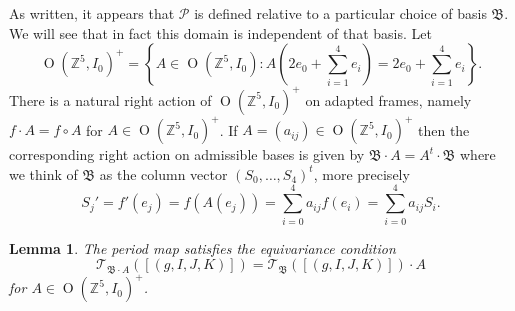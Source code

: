 \documentclass[12pt,letterpaper,reqno]{amsart}
\newtheorem{lem}[thm]{Lemma}
\theoremstyle{remark}
\theoremstyle{definition}
\numberwithin{thm}{section}
\numberwithin{equation}{section}
\numberwithin{figure}{section}
\newcommand{\Z}{\ensuremath{\mathbb Z}}
\newcommand{\calP}{\mathcal P}
\newcommand{\frakB}{\mathfrak B}
\DeclareMathOperator{\OO}{O}
\begin{document}
\bigskip


As written, it appears that $\calP$ is defined relative to a particular choice of basis $\frakB$. We will see that in fact this domain is 
independent of that basis.
Let
\[
\OO(\Z^5,I_0)^+ = \left\{ A \in \OO(\Z^5,I_0): A(2e_0 + \sum_{i=1}^4 e_i) =  2e_0 + \sum_{i=1}^4 e_i \right\}.
\]
There is a natural right action of $\OO(\Z^5,I_0)^+$ on adapted frames, namely $f\cdot A =f \circ A$ for $A \in \OO(\Z^5,I_0)^+$. If $A= (a_{ij}) \in \OO(\Z^5,I_0)^+$ then the corresponding right action on admissible bases is given by $\mathfrak{B} \cdot A = A^t \cdot \mathfrak{B}$ where we think of $\mathfrak{B}$ as the column vector $(S_0, \ldots, S_4)^t$, more precisely
\[
S_j' = f'(e_j) = f(A(e_j)) = \sum_{i=0}^4 a_{ij} f(e_i) = \sum_{i=0}^4 a_{ij} S_i.
\]

\begin{lem}\label{lem:period_equivariance}
The period map satisfies the equivariance condition
\[
\mathcal{T}_{\mathfrak{B} \cdot A}([(g, I, J, K)])= \mathcal{T}_{\mathfrak{B} }([(g, I, J, K)])\cdot A
\]	
for $A \in \OO(\Z^5,I_0)^+$. 
\end{lem}
\end{document}
